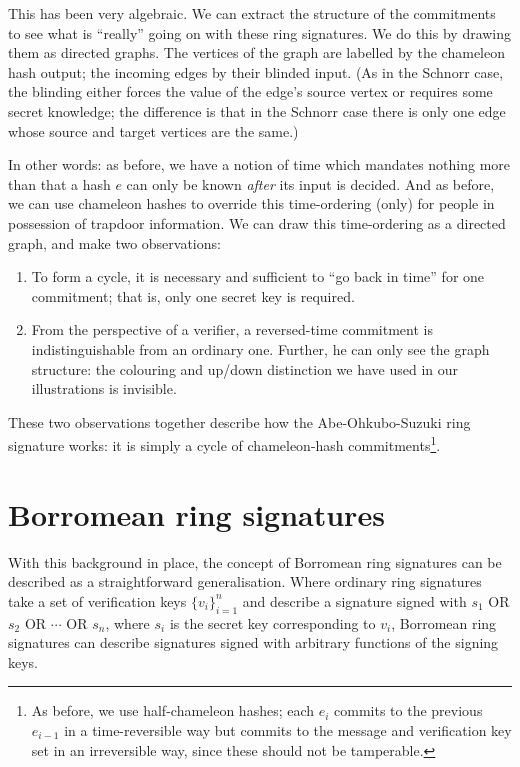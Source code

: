 \documentclass[letterpaper]{article}
\begin{document}
This has been very algebraic. We can extract the structure of the commitments to
see what is ``really'' going on with these ring signatures. We do this by drawing
them as directed graphs. The vertices of the graph are labelled by the chameleon
hash output; the incoming edges by their blinded input. (As in the Schnorr case,
the blinding either forces the value of the edge's source vertex or requires
some secret knowledge; the difference is that in the Schnorr case there is only
one edge whose source and target vertices are the same.)

In other words: as before, we have a
notion of time which mandates nothing more than that a hash $e$ can only be known
\emph{after} its input is decided. And as before, we can use chameleon hashes to
override this time-ordering (only) for people in possession of trapdoor information.
We can draw this time-ordering as a directed graph, and make two observations:
\begin{enumerate}
\item To form a cycle, it is necessary and sufficient to ``go back in time'' for
one commitment; that is, only one secret key is required.
\item From the perspective of a verifier, a reversed-time commitment is
indistinguishable from an ordinary one. Further, he can only see the graph
structure: the colouring and up/down distinction we have used in our illustrations
is invisible.
\end{enumerate}
These two observations together describe how the Abe-Ohkubo-Suzuki ring signature
works: it is simply a cycle of chameleon-hash commitments\footnote{As before,
we use half-chameleon hashes; each $e_i$ commits to the previous $e_{i-1}$
in a time-reversible way but commits to the message and verification key set
in an irreversible way, since these should not be tamperable.}.

\section{Borromean ring signatures}

With this background in place, the concept of Borromean ring signatures can be
described as a straightforward generalisation. Where ordinary ring signatures
take a set of verification keys $\{v_i\}_{i=1}^n$ and describe a signature
signed with $s_1$ OR $s_2$ OR $\cdots$ OR $s_n$, where $s_i$ is the secret
key corresponding to $v_i$, Borromean ring signatures can describe signatures
signed with arbitrary functions of the signing keys.
\end{document}
